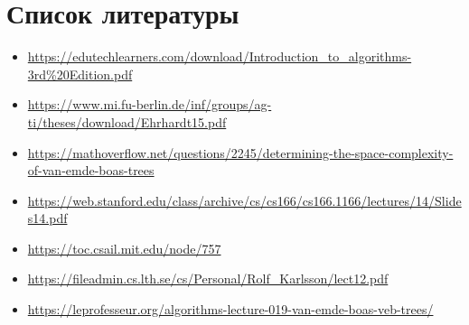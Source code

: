\documentclass{article}
\begin{document}
\section{Список литературы}
\begin{itemize}
    \item \url{https://edutechlearners.com/download/Introduction_to_algorithms-3rd\%20Edition.pdf}
    \item \url{https://www.mi.fu-berlin.de/inf/groups/ag-ti/theses/download/Ehrhardt15.pdf}
    \item \url{https://mathoverflow.net/questions/2245/determining-the-space-complexity-of-van-emde-boas-trees}
    \item \url{https://web.stanford.edu/class/archive/cs/cs166/cs166.1166/lectures/14/Slides14.pdf}
    \item \url{https://toc.csail.mit.edu/node/757}
    \item \url{https://fileadmin.cs.lth.se/cs/Personal/Rolf_Karlsson/lect12.pdf}
    \item \url{https://leprofesseur.org/algorithms-lecture-019-van-emde-boas-veb-trees/}
\end{itemize}
\end{document}
